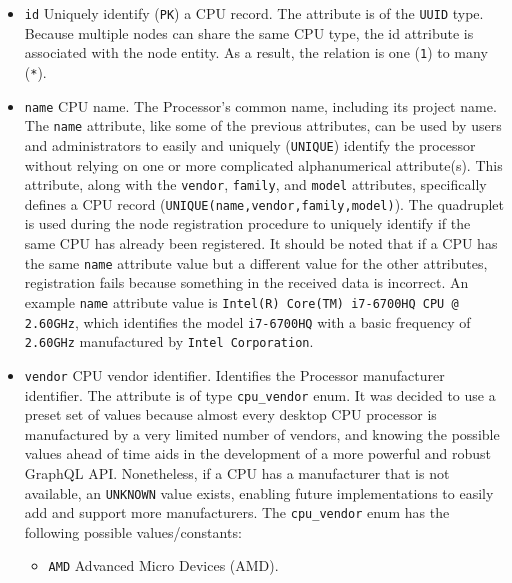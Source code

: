\begin{itemize}
  \item \texttt{id}
    \newline
    Uniquely identify (\texttt{PK}) a CPU record.
    \newline
    The attribute is of the \texttt{UUID} type.
    \newline
    Because multiple nodes can share the same CPU type, the id attribute is associated
    with the node entity. As a result, the relation is one (\texttt{1}) to many
    (\texttt{*}).

  \item \texttt{name}
    \newline
    CPU name.
    \newline
    The Processor's common name, including its project name.
    \newline
    The \texttt{name} attribute, like some of the previous attributes, can be
    used by users and administrators to easily and uniquely (\texttt{UNIQUE}) identify
    the processor without relying on one or more complicated alphanumerical attribute(s).
    \newline
    This attribute, along with the \texttt{vendor}, \texttt{family}, and \texttt{model}
    attributes, specifically defines a CPU record (\texttt{UNIQUE(name,vendor,family,model)}).
    The quadruplet is used during the node registration procedure to uniquely identify
    if the same CPU has already been registered. It should be noted that if a
    CPU has the same \texttt{name} attribute value but a different value for the
    other attributes, registration fails because something in the received data
    is incorrect.
    \newline
    An example \texttt{name} attribute value is \texttt{Intel(R) Core(TM) i7-6700HQ
    CPU @ 2.60GHz}, which identifies the model \texttt{i7-6700HQ} with a basic
    frequency of \texttt{2.60GHz} manufactured by \texttt{Intel Corporation}.

  \item \texttt{vendor}
    \newline
    CPU vendor identifier.
    \newline
    Identifies the Processor manufacturer identifier.
    \newline
    The attribute is of type \texttt{cpu\_vendor} enum. It was decided to use a
    preset set of values because almost every desktop CPU processor is
    manufactured by a very limited number of vendors, and knowing the possible values
    ahead of time aids in the development of a more powerful and robust GraphQL API.
    Nonetheless, if a CPU has a manufacturer that is not available, an \texttt{UNKNOWN}
    value exists, enabling future implementations to easily add and support more
    manufacturers.
    \newline
    The \texttt{cpu\_vendor} enum has the following possible values/constants:
    \begin{itemize}
      \item \texttt{AMD}
        \newline
        Advanced Micro Devices (AMD).


\end{itemize}
\end{itemize}
